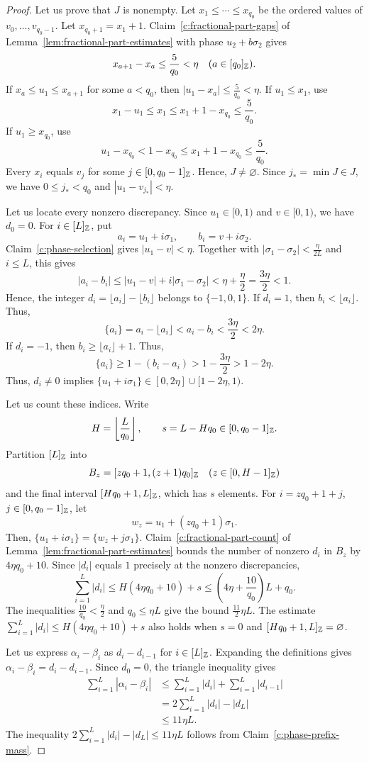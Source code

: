 \begin{proof}
 Let us prove that $J$ is nonempty. Let $x_1\le\cdots\le x_{q_0}$ be the ordered values of $v_0,\ldots,v_{q_0-1}$. Let $x_{q_0+1}=x_1+1$.
Claim~\ref{c:fractional-part-gaps} of Lemma~\ref{lem:fractional-part-estimates} with phase $u_2+b\sigma_2$ gives
\[
 x_{a+1}-x_a\le\frac5{q_0}<\eta
 \quad(a\in[q_0]_{\mathbb Z}).
\]
If $x_a\le u_1\le x_{a+1}$ for some $a<q_0$, then $|u_1-x_a|\le\frac5{q_0}<\eta$. If $u_1\le x_1$, use
\[
 x_1-u_1\le x_1\le x_1+1-x_{q_0}\le\frac5{q_0}.
\]
If $u_1\ge x_{q_0}$, use
\[
 u_1-x_{q_0}<1-x_{q_0}\le x_1+1-x_{q_0}\le\frac5{q_0}.
\]
Every $x_i$ equals $v_j$ for some $j\in[0,q_0-1]_{\mathbb Z}$. Hence, $J\ne\varnothing$. Since $j_*=\min J\in J$, we have $0\le j_*<q_0$ and $|u_1-v_{j_*}|<\eta$.

 Let us locate every nonzero discrepancy. Since $u_1\in[0,1)$ and $v\in[0,1)$, we have $d_0=0$. For $i\in[L]_{\mathbb Z}$, put
\[
 a_i=u_1+i\sigma_1,\qquad b_i=v+i\sigma_2.
\]
Claim~\ref{c:phase-selection} gives $|u_1-v|<\eta$.
Together with $|\sigma_1-\sigma_2|<\frac{\eta}{2L}$ and $i\le L$, this gives
\[
 |a_i-b_i|
 \le|u_1-v|+i|\sigma_1-\sigma_2|
 <\eta+\frac{\eta}{2}=\frac{3\eta}{2}<1.
\]
Hence, the integer $d_i=\lfloor a_i\rfloor-\lfloor b_i\rfloor$ belongs to $\{-1,0,1\}$. If $d_i=1$, then $b_i<\lfloor a_i\rfloor$. Thus,
\[
 \{a_i\}=a_i-\lfloor a_i\rfloor<a_i-b_i<\frac{3\eta}{2}<2\eta.
\]
If $d_i=-1$, then $b_i\ge\lfloor a_i\rfloor+1$. Thus,
\[
 \{a_i\}\ge1-(b_i-a_i)>1-\frac{3\eta}{2}>1-2\eta.
\]
Thus, $d_i\ne0$ implies $\{u_1+i\sigma_1\}\in[0,2\eta]\cup[1-2\eta,1)$.

Let us count these indices. Write
\[
 H=\left\lfloor\frac{L}{q_0}\right\rfloor,\qquad
 s=L-Hq_0\in[0,q_0-1]_{\mathbb Z}.
\]
Partition $[L]_{\mathbb Z}$ into
\[
 B_z=[zq_0+1,(z+1)q_0]_{\mathbb Z}
 \quad(z\in[0,H-1]_{\mathbb Z})
\]
and the final interval $[Hq_0+1,L]_{\mathbb Z}$, which has $s$ elements. For $i=zq_0+1+j$, $j\in[0,q_0-1]_{\mathbb Z}$, let
\[
 w_z=u_1+(zq_0+1)\sigma_1.
\]
Then, $\{u_1+i\sigma_1\}=\{w_z+j\sigma_1\}$. Claim~\ref{c:fractional-part-count} of Lemma~\ref{lem:fractional-part-estimates} bounds the number of nonzero $d_i$ in $B_z$ by $4\eta q_0+10$. Since $|d_i|$ equals $1$ precisely at the nonzero discrepancies,
\[
 \sum_{i=1}^L|d_i|
 \le H(4\eta q_0+10)+s
 \le\left(4\eta+\frac{10}{q_0}\right)L+q_0.
\]
The inequalities $\frac{10}{q_0}<\frac\eta2$ and $q_0\le\eta L$ give the bound $\frac{11}{2}\eta L$. The estimate $\sum_{i=1}^L|d_i|\le H(4\eta q_0+10)+s$ also holds when $s=0$ and $[Hq_0+1,L]_{\mathbb Z}=\varnothing$.

 Let us express $\alpha_i-\beta_i$ as $d_i-d_{i-1}$ for $i\in[L]_{\mathbb Z}$. Expanding the definitions gives $\alpha_i-\beta_i=d_i-d_{i-1}$. Since $d_0=0$, the triangle inequality gives
\[
 \begin{aligned}
 \sum_{i=1}^L|\alpha_i-\beta_i|
 &\le\sum_{i=1}^L|d_i|+\sum_{i=1}^L|d_{i-1}|\\
 &=2\sum_{i=1}^L|d_i|-|d_L|\\
 &\le11\eta L.
 \end{aligned}
\]
The inequality $2\sum_{i=1}^L|d_i|-|d_L|\le11\eta L$ follows from Claim~\ref{c:phase-prefix-mass}.
\end{proof}

